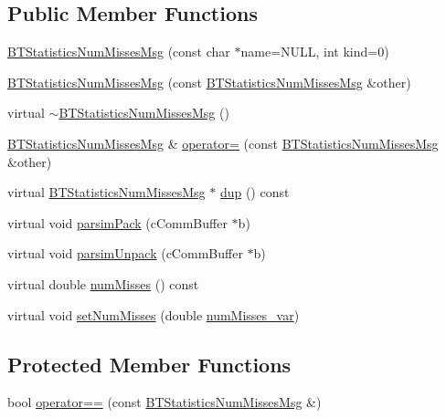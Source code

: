 \subsection*{Public Member Functions}
\begin{DoxyCompactItemize}
\item 
\hyperlink{classBTStatisticsNumMissesMsg_a12062190375e684b1ab12e51b3b11e6d}{B\+T\+Statistics\+Num\+Misses\+Msg} (const char $\ast$name=N\+U\+L\+L, int kind=0)
\item 
\hyperlink{classBTStatisticsNumMissesMsg_ab731ecc85c292a7d74d99bf09c099e57}{B\+T\+Statistics\+Num\+Misses\+Msg} (const \hyperlink{classBTStatisticsNumMissesMsg}{B\+T\+Statistics\+Num\+Misses\+Msg} \&other)
\item 
virtual \hyperlink{classBTStatisticsNumMissesMsg_a07705f4e854c08cca570365556993408}{$\sim$\+B\+T\+Statistics\+Num\+Misses\+Msg} ()
\item 
\hyperlink{classBTStatisticsNumMissesMsg}{B\+T\+Statistics\+Num\+Misses\+Msg} \& \hyperlink{classBTStatisticsNumMissesMsg_a4975eb2d2cc3f64083f4a643c236fcff}{operator=} (const \hyperlink{classBTStatisticsNumMissesMsg}{B\+T\+Statistics\+Num\+Misses\+Msg} \&other)
\item 
virtual \hyperlink{classBTStatisticsNumMissesMsg}{B\+T\+Statistics\+Num\+Misses\+Msg} $\ast$ \hyperlink{classBTStatisticsNumMissesMsg_ac9bf69db530be787cb6b13063927f8e1}{dup} () const 
\item 
virtual void \hyperlink{classBTStatisticsNumMissesMsg_af0ede08af67692ee012ee06f076a5a67}{parsim\+Pack} (c\+Comm\+Buffer $\ast$b)
\item 
virtual void \hyperlink{classBTStatisticsNumMissesMsg_a80c048371a7e616236d8f3118d59e6b3}{parsim\+Unpack} (c\+Comm\+Buffer $\ast$b)
\item 
virtual double \hyperlink{classBTStatisticsNumMissesMsg_a92411392b465eb6262f7ca3cd17b9195}{num\+Misses} () const 
\item 
virtual void \hyperlink{classBTStatisticsNumMissesMsg_ab89ff20783a4bed86f5eb21e58ae09b6}{set\+Num\+Misses} (double \hyperlink{classBTStatisticsNumMissesMsg_a28bbdae0b44bd313c2377e841097b5b4}{num\+Misses\+\_\+var})
\end{DoxyCompactItemize}
\subsection*{Protected Member Functions}
\begin{DoxyCompactItemize}
\item 
bool \hyperlink{classBTStatisticsNumMissesMsg_acced5f9552f3768cd03717ac574190b8}{operator==} (const \hyperlink{classBTStatisticsNumMissesMsg}{B\+T\+Statistics\+Num\+Misses\+Msg} \&)
\end{DoxyCompactItemize}
